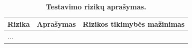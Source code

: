 \documentclass[12pt]{article}
\begin{document}
\begin{table}[htb!]
    \captionsetup{justification=centering}
    \caption{\small\textbf{Testavimo rizikų aprašymas.}}
    \vskip -10pt
    \begin{tabular}{
        |>{\centering\arraybackslash}m{4cm}
        |>{\centering\arraybackslash}m{5cm}
        |>{\centering\arraybackslash}m{7cm}|
    }
        \hline
        \textbf{\cellcolor{deepchampagne}Rizika} &
        \textbf{\cellcolor{deepchampagne}Aprašymas} &
        \textbf{\cellcolor{deepchampagne}Rizikos tikimybės mažinimas}  \\
        \hline
        \multicolumn{1}{|>{\raggedright\arraybackslash}m{4cm}|}
            {...} &
        \multicolumn{1}{>{\raggedright\arraybackslash}m{5cm}|}{...} &
        \multicolumn{1}{>{\raggedright\arraybackslash}m{7cm}|}{...}\\
        \hline
    \end{tabular}
    \label{table:RIZIKOS}
\end{table}

\end{document}
